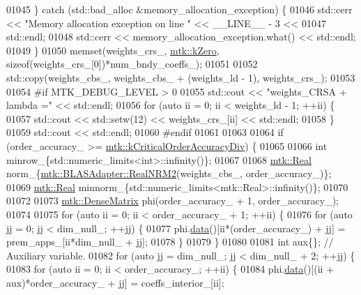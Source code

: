 \begin{DoxyCode}
{{01045   \} \textcolor{keywordflow}{catch} (std::bad\_alloc &memory\_allocation\_exception) \{
01046     std::cerr << \textcolor{stringliteral}{"Memory allocation exception on line "} << \_\_LINE\_\_ - 3 <<
01047       std::endl;
01048     std::cerr << memory\_allocation\_exception.what() << std::endl;
01049   \}
01050   memset(weights\_crs\_, \hyperlink{group__c01-roots_ga59a451a5fae30d59649bcda274fea271}{mtk::kZero}, \textcolor{keyword}{sizeof}(weights\_crs\_[0])*num\_bndy\_coeffs\_);
01051 
01052   std::copy(weights\_cbs\_, weights\_cbs\_ + (weights\_ld - 1), weights\_crs\_);
01053 
01054 \textcolor{preprocessor}{  #if MTK\_DEBUG\_LEVEL > 0}
01055   std::cout << \textcolor{stringliteral}{"weights\_CRSA + lambda ="} << std::endl;
01056   \textcolor{keywordflow}{for} (\textcolor{keyword}{auto} ii = 0; ii < weights\_ld - 1; ++ii) \{
01057     std::cout << std::setw(12) << weights\_crs\_[ii] << std::endl;
01058   \}
01059   std::cout << std::endl;
01060 \textcolor{preprocessor}{  #endif}
01061 
01063 
01064   \textcolor{keywordflow}{if} (order\_accuracy\_ >= \hyperlink{group__c01-roots_ga0898eef2108473e44a5223932d571c31}{mtk::kCriticalOrderAccuracyDiv}) \{
01065 
01066     \textcolor{keywordtype}{int} minrow\_\{std::numeric\_limits<int>::infinity()\};
01067 
01068     \hyperlink{group__c01-roots_gac080bbbf5cbb5502c9f00405f894857d}{mtk::Real} norm\_\{\hyperlink{classmtk_1_1BLASAdapter_ab92440888b730863244c5d9479c11aca}{mtk::BLASAdapter::RealNRM2}(weights\_cbs\_,
      order\_accuracy\_)\};
01069     \hyperlink{group__c01-roots_gac080bbbf5cbb5502c9f00405f894857d}{mtk::Real} minnorm\_\{std::numeric\_limits<mtk::Real>::infinity()\};
01070 
01072 
01073     \hyperlink{classmtk_1_1DenseMatrix}{mtk::DenseMatrix} phi(order\_accuracy\_ + 1, order\_accuracy\_);
01074 
01075     \textcolor{keywordflow}{for} (\textcolor{keyword}{auto} ii = 0; ii < order\_accuracy\_ + 1; ++ii) \{
01076       \textcolor{keywordflow}{for} (\textcolor{keyword}{auto} jj = 0; jj < dim\_null\_; ++jj) \{
01077         phi.\hyperlink{classmtk_1_1DenseMatrix_a16b3ff56feb2658b9fc7147d1de4d8e7}{data}()[ii*(order\_accuracy\_) + jj] = prem\_apps\_[ii*dim\_null\_ + jj];
01078       \}
01079     \}
01080 
01081     \textcolor{keywordtype}{int} aux\{\};  \textcolor{comment}{// Auxiliary variable.}
01082     \textcolor{keywordflow}{for} (\textcolor{keyword}{auto} jj = dim\_null\_; jj < dim\_null\_ + 2; ++jj) \{
01083       \textcolor{keywordflow}{for} (\textcolor{keyword}{auto} ii = 0; ii < order\_accuracy\_; ++ii) \{
01084         phi.\hyperlink{classmtk_1_1DenseMatrix_a16b3ff56feb2658b9fc7147d1de4d8e7}{data}()[(ii + aux)*order\_accuracy\_ + jj] = coeffs\_interior\_[ii];
}}
\end{DoxyCode}
